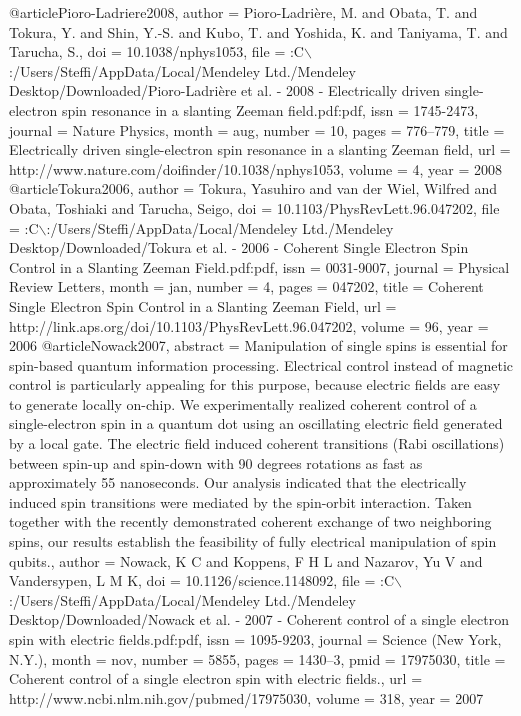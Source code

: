 @article{Pioro-Ladriere2008,
author = {Pioro-Ladri{\`{e}}re, M. and Obata, T. and Tokura, Y. and Shin, Y.-S. and Kubo, T. and Yoshida, K. and Taniyama, T. and Tarucha, S.},
doi = {10.1038/nphys1053},
file = {:C$\backslash$:/Users/Steffi/AppData/Local/Mendeley Ltd./Mendeley Desktop/Downloaded/Pioro-Ladri{\`{e}}re et al. - 2008 - Electrically driven single-electron spin resonance in a slanting Zeeman field.pdf:pdf},
issn = {1745-2473},
journal = {Nature Physics},
month = {aug},
number = {10},
pages = {776--779},
title = {{Electrically driven single-electron spin resonance in a slanting Zeeman field}},
url = {http://www.nature.com/doifinder/10.1038/nphys1053},
volume = {4},
year = {2008}
}
@article{Tokura2006,
author = {Tokura, Yasuhiro and van der Wiel, Wilfred and Obata, Toshiaki and Tarucha, Seigo},
doi = {10.1103/PhysRevLett.96.047202},
file = {:C$\backslash$:/Users/Steffi/AppData/Local/Mendeley Ltd./Mendeley Desktop/Downloaded/Tokura et al. - 2006 - Coherent Single Electron Spin Control in a Slanting Zeeman Field.pdf:pdf},
issn = {0031-9007},
journal = {Physical Review Letters},
month = {jan},
number = {4},
pages = {047202},
title = {{Coherent Single Electron Spin Control in a Slanting Zeeman Field}},
url = {http://link.aps.org/doi/10.1103/PhysRevLett.96.047202},
volume = {96},
year = {2006}
}
@article{Nowack2007,
abstract = {Manipulation of single spins is essential for spin-based quantum information processing. Electrical control instead of magnetic control is particularly appealing for this purpose, because electric fields are easy to generate locally on-chip. We experimentally realized coherent control of a single-electron spin in a quantum dot using an oscillating electric field generated by a local gate. The electric field induced coherent transitions (Rabi oscillations) between spin-up and spin-down with 90 degrees rotations as fast as approximately 55 nanoseconds. Our analysis indicated that the electrically induced spin transitions were mediated by the spin-orbit interaction. Taken together with the recently demonstrated coherent exchange of two neighboring spins, our results establish the feasibility of fully electrical manipulation of spin qubits.},
author = {Nowack, K C and Koppens, F H L and Nazarov, Yu V and Vandersypen, L M K},
doi = {10.1126/science.1148092},
file = {:C$\backslash$:/Users/Steffi/AppData/Local/Mendeley Ltd./Mendeley Desktop/Downloaded/Nowack et al. - 2007 - Coherent control of a single electron spin with electric fields.pdf:pdf},
issn = {1095-9203},
journal = {Science (New York, N.Y.)},
month = {nov},
number = {5855},
pages = {1430--3},
pmid = {17975030},
title = {{Coherent control of a single electron spin with electric fields.}},
url = {http://www.ncbi.nlm.nih.gov/pubmed/17975030},
volume = {318},
year = {2007}
}
